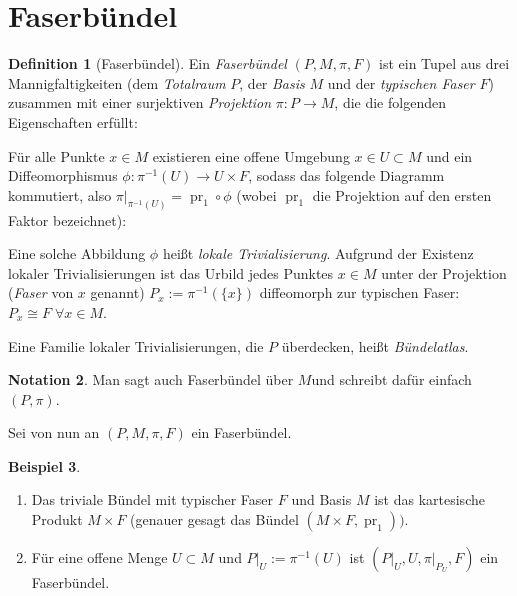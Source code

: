 \documentclass[a4paper]{scrreprt}
\numberwithin{equation}{chapter}
\DeclareMathOperator{\pr}{pr}
\theoremstyle{definition}
\newtheorem{defn}{Definition}[section]
\newtheorem{bsp}[defn]{Beispiel}
\newtheorem{nota}[defn]{Notation}
\begin{document}
	\section{Faserbündel}
		\begin{defn}[Faserbündel]
			Ein \emph{Faserbündel} $(P,M,\pi ,F)$ ist ein Tupel aus drei Mannigfaltigkeiten (dem \emph{Totalraum} $P$, der \emph{Basis} $M$ und der \emph{typischen Faser} $F$) zusammen mit einer surjektiven \emph{Projektion} $\pi\colon P\rightarrow M$, die die folgenden Eigenschaften erfüllt:

				Für alle Punkte $x\in M$ existieren eine offene Umgebung $x\in U\subset M$ und ein Diffeomorphismus $\phi\colon \pi^{-1}(U)\rightarrow U\times F$, sodass das folgende Diagramm kommutiert, also $\pi\vert_{\pi^{-1}(U)}=\pr_1\circ\phi$ (wobei $\pr_1$ die Projektion auf den ersten Faktor bezeichnet):
			\begin{center}
			\end{center}
			Eine solche Abbildung $\phi$ heißt \emph{lokale Trivialisierung}. Aufgrund der Existenz lokaler Trivialisierungen ist das Urbild jedes Punktes $x\in M$ unter der Projektion (\emph{Faser} von $x$ genannt) $P_x:=\pi^{-1}(\lbrace x\rbrace )$ diffeomorph zur typischen Faser: $P_x\cong F \; \forall x\in M$.

			Eine Familie lokaler Trivialisierungen, die $P$ überdecken, heißt \emph{Bündelatlas}.
		\end{defn}
		\begin{nota}
			Man sagt auch \glqq Faserbündel über $M$\grqq und schreibt dafür einfach $(P,\pi)$.
		\end{nota}
		Sei von nun an $(P,M,\pi ,F)$ ein Faserbündel.
		\begin{bsp}\hfill
			\begin{enumerate}
				\item Das triviale Bündel mit typischer Faser $F$ und Basis $M$ ist das kartesische Produkt $M\times F$ (genauer gesagt das Bündel $(M\times F,\pr_1))$.
				\item Für eine offene Menge $U\subset M$ und $P\vert_U:=\pi^{-1}(U)$ ist $(P\vert_U,U,\pi\vert_{P_U},F)$ ein Faserbündel.
			\end{enumerate}
		\end{bsp}
\end{document}
